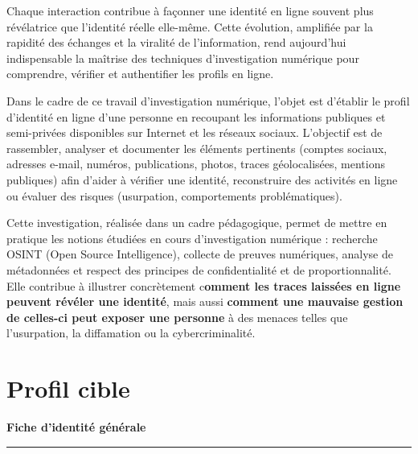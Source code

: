 \documentclass[memoire, 12pt]{report}
\begin{document}
Chaque interaction contribue à façonner une identité en ligne souvent plus révélatrice que l’identité réelle elle-même. Cette évolution, amplifiée par la rapidité des échanges et la viralité de l’information, rend aujourd’hui indispensable la maîtrise des techniques d’investigation numérique pour comprendre, vérifier et authentifier les profils en ligne.

Dans le cadre de ce travail d’investigation numérique, l’objet est d’établir le profil d’identité en ligne d’une personne en recoupant les informations publiques et semi-privées disponibles sur Internet et les réseaux sociaux. L’objectif est de rassembler, analyser et documenter les éléments pertinents (comptes sociaux, adresses e-mail, numéros, publications, photos, traces géolocalisées, mentions publiques) afin d’aider à vérifier une identité, reconstruire des activités en ligne ou évaluer des risques (usurpation, comportements problématiques).

Cette investigation, réalisée dans un cadre pédagogique, permet de mettre en pratique les notions étudiées en cours d’investigation numérique : recherche OSINT (Open Source Intelligence), collecte de preuves numériques, analyse de métadonnées et respect des principes de confidentialité et de proportionnalité. Elle contribue à illustrer concrètement c\textbf{omment les traces laissées en ligne peuvent révéler une identité}, mais aussi \textbf{comment une mauvaise gestion de celles-ci peut exposer une personne} à des menaces telles que l’usurpation, la diffamation ou la cybercriminalité.

\section{Profil cible}
\begin{center}
    {\Large \textbf{Fiche d'identité générale}}\\[0.2cm]
    \rule{0.8\textwidth}{0.4pt}
\end{center}

\vspace{0.5cm}

\renewcommand{\arraystretch}{1.4}
\end{document}
